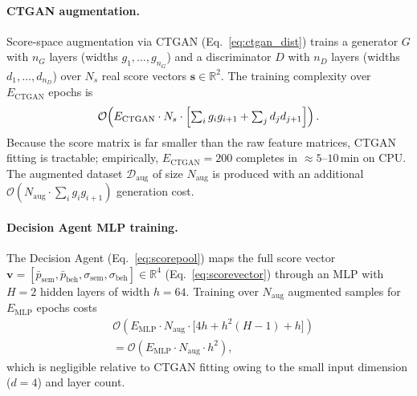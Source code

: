 \documentclass[3p]{elsarticle}
\begin{document}
\begin{changedblock}
\paragraph{CTGAN augmentation.}
Score-space augmentation via CTGAN (Eq.~\eqref{eq:ctgan_dist}) trains a generator $G$ with
$n_G$ layers (widths $g_1,\ldots,g_{n_G}$) and a discriminator $D$ with $n_D$ layers
(widths $d_1,\ldots,d_{n_D}$) over $N_s$ real score vectors $\mathbf{s} \in \mathbb{R}^{2}$.
The training complexity over $E_{\mathrm{CTGAN}}$ epochs is
\begin{equation}
  \mathcal{O}\!\left(E_{\mathrm{CTGAN}} \cdot N_s \cdot
  \Bigl[\textstyle\sum_{i} g_i g_{i+1} + \sum_{j} d_j d_{j+1}\Bigr]\right).
  \label{eq:ctgan_complexity}
\end{equation}
Because the score matrix is far smaller than the raw feature matrices, CTGAN fitting is
tractable; empirically, $E_{\mathrm{CTGAN}} = 200$ completes in $\approx 5$--$10$\,min on
CPU.
The augmented dataset $\mathcal{D}_{\mathrm{aug}}$ of size $N_{\mathrm{aug}}$ is produced
with an additional $\mathcal{O}(N_{\mathrm{aug}} \cdot \sum_i g_i g_{i+1})$ generation cost.

\paragraph{Decision Agent MLP training.}
The Decision Agent (Eq.~\eqref{eq:scorepool}) maps the full score vector
$\mathbf{v} = [\bar{p}_{\mathrm{sem}}, \bar{p}_{\mathrm{beh}}, \sigma_{\mathrm{sem}},
\sigma_{\mathrm{beh}}] \in \mathbb{R}^4$ (Eq.~\eqref{eq:scorevector}) through an MLP with
$H = 2$ hidden layers of width $h = 64$.
Training over $N_{\mathrm{aug}}$ augmented samples for $E_{\mathrm{MLP}}$ epochs costs
\begin{align}
  &\mathcal{O}\!\left(E_{\mathrm{MLP}} \cdot N_{\mathrm{aug}} \cdot
  \bigl[4h + h^2(H{-}1) + h\bigr]\right) \nonumber\\
  &= \mathcal{O}\!\left(E_{\mathrm{MLP}} \cdot N_{\mathrm{aug}} \cdot h^2\right),
  \label{eq:mlp_complexity}
\end{align}
which is negligible relative to CTGAN fitting owing to the small input dimension ($d=4$)
and layer count.


\end{changedblock}
\end{document}
